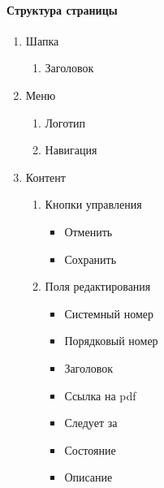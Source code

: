\paragraph{Структура страницы}
\begin{enumerate}
	\item Шапка
	\begin{enumerate}
		\item Заголовок
	\end{enumerate}

	\item Меню
	\begin{enumerate}
		\item Логотип
		\item Навигация
	\end{enumerate}

	\item Контент
	\begin{enumerate}
		\item Кнопки управления
		\begin{itemize}
			\item Отменить
			\item Сохранить
		\end{itemize}
		\item Поля редактирования
		\begin{itemize}
			\item Системный номер
			\item Порядковый номер
			\item Заголовок
			\item Ссылка на pdf
			\item Следует за
			\item Состояние
			\item Описание
		\end{itemize}
	\end{enumerate}
\end{enumerate}

